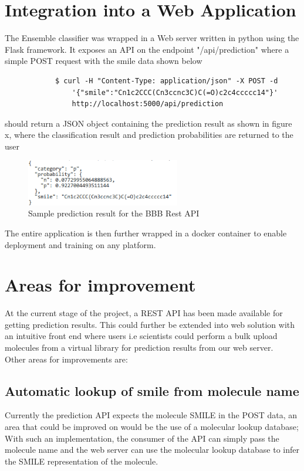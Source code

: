 \documentclass[a4paper,12pt]{report}
\begin{document}
	\section{Integration into a Web Application}
		The Ensemble classifier was wrapped in a Web server written in python using the Flask framework. It exposes an API on the endpoint "/api/prediction" where a simple POST request with the smile data shown below
		\begin{verbatim}
			$ curl -H "Content-Type: application/json" -X POST -d 
			    '{"smile":"Cn1c2CCC(Cn3ccnc3C)C(=O)c2c4ccccc14"}'   
			    http://localhost:5000/api/prediction
		\end{verbatim}
		should return a JSON object containing the prediction result as shown in figure x, where the classification result and prediction probabilities are returned to the user
			\begin{figure}[H]
				\centering
				\includegraphics[width=0.6\textwidth,scale=1]{images/sample_prediction_result}
				\caption{Sample prediction result for the BBB Rest API}
				\label{fig:bbb_sample_prediction_result}
			\end{figure}
		The entire application is then further wrapped in a docker container to enable deployment and training on any platform.
	\section{Areas for improvement}
		At the current stage of the project, a REST API has been made available for getting prediction results. This could further be extended into web solution with an intuitive front end where users i.e scientists could perform a bulk upload molecules from a virtual library for prediction results from our web server. \\
		Other areas for improvements are:
		\subsection{Automatic lookup of smile from molecule name}
		Currently the prediction API expects the molecule SMILE in the POST data, an area that could be improved on would be the use of a molecular lookup database; With such an implementation, the consumer of the API can simply pass the molecule name and the web server can use the molecular lookup database to infer the SMILE representation of the molecule.
		
\end{document}
